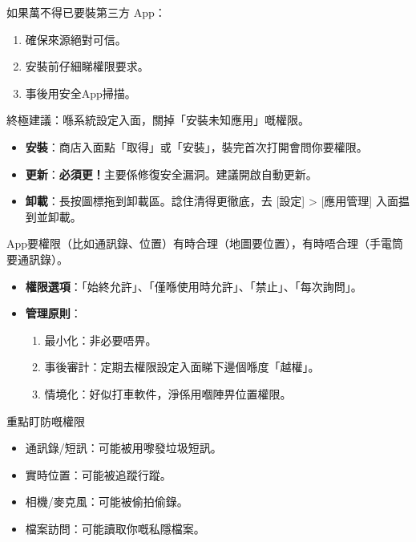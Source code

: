如果萬不得已要裝第三方 App：

\begin{enumerate}
  \item 確保來源絕對可信。
  \item 安裝前仔細睇權限要求。
  \item 事後用安全App掃描。
\end{enumerate}

終極建議：喺系統設定入面，關掉「安裝未知應用」嘅權限。


\begin{itemize}
  \item \textbf{安裝}：商店入面點「取得」或「安裝」，裝完首次打開會問你要權限。
  \item \textbf{更新}：\textbf{必須更！}主要係修復安全漏洞。建議開啟自動更新。
  \item \textbf{卸載}：長按圖標拖到卸載區。諗住清得更徹底，去 [設定] > [應用管理] 入面揾到並卸載。
\end{itemize}


App要權限（比如通訊錄、位置）有時合理（地圖要位置），有時唔合理（手電筒要通訊錄）。

\begin{itemize}
  \item \textbf{權限選項}：「始終允許」、「僅喺使用時允許」、「禁止」、「每次詢問」。
  \item \textbf{管理原則}：
  \begin{enumerate}
    \item 最小化：非必要唔畀。
    \item 事後審計：定期去權限設定入面睇下邊個喺度「越權」。
    \item 情境化：好似打車軟件，淨係用嗰陣畀位置權限。
  \end{enumerate}
\end{itemize}

\begin{tcbwarn}{重點盯防嘅權限}
\begin{itemize}
  \item 通訊錄/短訊：可能被用嚟發垃圾短訊。
  \item 實時位置：可能被追蹤行蹤。
  \item 相機/麥克風：可能被偷拍偷錄。
  \item 檔案訪問：可能讀取你嘅私隱檔案。
\end{itemize}

\end{tcbwarn}

